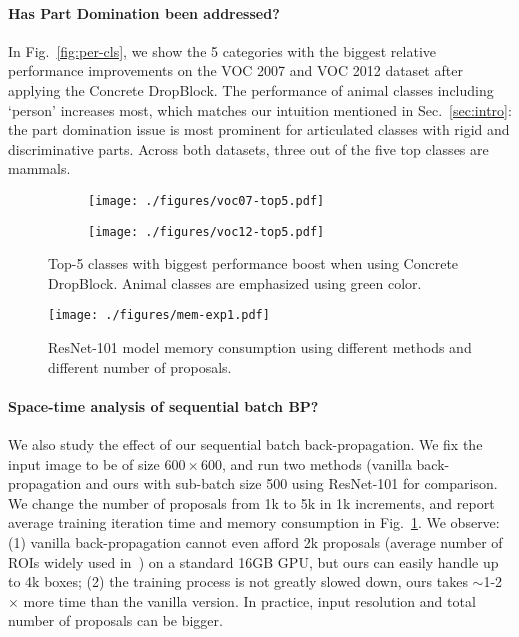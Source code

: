 \documentclass[10pt,twocolumn,letterpaper]{article}
\begin{document}
\vspace{-1em}
\paragraph{\textbf{Has Part Domination been addressed?}}
In Fig.~\ref{fig:per-cls}, we show the 5 categories with the biggest relative performance improvements on the VOC 2007 and VOC 2012 dataset after applying the Concrete DropBlock. The performance of animal classes including `person' increases most, which matches our intuition mentioned in Sec.~\ref{sec:intro}: the part domination issue is most prominent for articulated classes with rigid and discriminative parts. Across both datasets, three out of the five top classes are mammals.

\begin{figure}[t]
\centering
\begin{subfigure}{0.49\linewidth}
\centering\texttt{[image: ./figures/voc07-top5.pdf]}
\end{subfigure}\begin{subfigure}{0.49\linewidth}
\centering\texttt{[image: ./figures/voc12-top5.pdf]}
\end{subfigure}
\vspace{-1em}
\caption{Top-5 classes with biggest performance boost when using Concrete DropBlock. Animal classes are emphasized using green color.}
\label{fig:per-cls}
\vspace{0.5em}
\centering
\texttt{[image: ./figures/mem-exp1.pdf]}
\vspace{-1em}
\caption{ResNet-101 model memory consumption using different methods and different number of proposals.} 
\label{fig:mem-exp}
\vspace{-1em}
\end{figure}

\vspace{-1em}
\paragraph{\textbf{Space-time analysis of sequential batch BP?} }
We also study the effect of our sequential batch back-propagation. We fix the input image to be of size $600 \times 600$, and run two methods (vanilla back-propagation and ours with sub-batch size 500 using ResNet-101 for comparison. We change the number of proposals from 1k to 5k in 1k increments, and report average training iteration time and memory consumption in Fig.~\ref{fig:mem-exp}. We observe: (1)  vanilla back-propagation cannot even afford 2k proposals (average number of ROIs widely used in~\cite{fastrcnn, Bilen16, tang2017multiple}) on a standard 16GB GPU, but ours can easily handle up to 4k boxes; (2) the training process is not greatly slowed down, ours takes $\sim$1-2$\times$ more time than the vanilla version. In practice,  input resolution and total number of proposals can be  bigger. 
\end{document}
